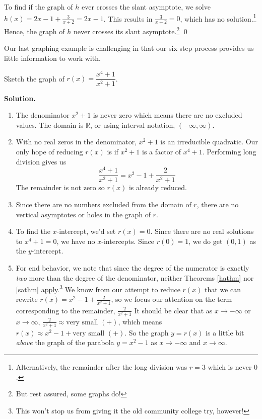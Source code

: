 \documentclass{ximera}
\begin{document}
\begin{example}
To find if the graph of $h$ ever crosses the slant asymptote, we solve $h(x) = 2x-1+\frac{3}{x+2}= 2x-1$.  This results in $\frac{3}{x+2} = 0$, which has no solution.\footnote{Alternatively, the remainder after the long division was $r=3$ which is never $0$.} Hence, the graph of $h$ never crosses its slant asymptote.\footnote{But rest assured, some graphs do!}
\qed


\end{example}

Our last graphing example is challenging in that our six step process provides us little information to work with.

\begin{example}   \label{carefulanalysisneeded} Sketch the graph of $r(x) = \dfrac{x^4+1}{x^2+1}$.

\smallskip

{\bf Solution.}

\begin{enumerate}

\item  The denominator $x^2+1$ is never zero which means there are no excluded values.  The domain is $\mathbb{R}$, or using interval notation,  $(-\infty, \infty)$.

\item  With no real zeros in the denominator, $x^2+1$ is an irreducible quadratic.  Our only hope of reducing $r(x)$ is if $x^2+1$ is a factor of $x^4+1$.  Performing long division gives us \[\frac{x^4+1}{x^2+1} = x^2-1+\frac{2}{x^2+1}\] The remainder is not zero so $r(x)$ is already reduced.

\item Since there are no numbers excluded from the domain of $r$, there are no vertical asymptotes or holes in the graph of $r$.

\item  To find the $x$-intercept, we'd set $r(x) = 0$.  Since there are no real solutions to $x^4+1=0$, we have no $x$-intercepts.  Since $r(0) = 1$, we do get $(0,1)$ as the $y$-intercept.

\item  For end behavior, we note that since the degree of the numerator is exactly \textit{two} more than the degree of the denominator, neither Theorems \ref{hathm} nor \ref{sathm} apply.\footnote{This won't stop us from giving it the old community college try, however!} We know from our attempt to reduce $r(x)$ that we can rewrite $r(x) = x^2-1+\frac{2}{x^2+1}$, so we focus our attention on the term corresponding to the remainder, $\frac{2}{x^2+1}$  It should be clear that as $x \rightarrow - \infty$ or $x \rightarrow \infty$, $\frac{2}{x^2+1} \approx \text{very small $(+)$}$, which means $r(x) \approx x^2-1 + \text{very small $(+)$}$.  So the graph $y=r(x)$ is a little bit \textit{above} the graph of the parabola $y=x^2-1$ as $x \rightarrow  -\infty$ and $x \rightarrow \infty$. 



\end{enumerate}
\end{example}
\end{document}
